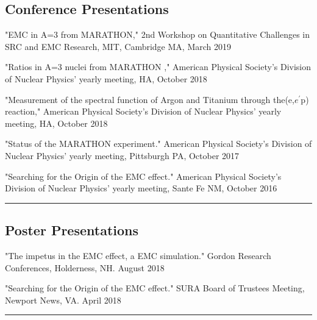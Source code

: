 \documentclass[12pt,letterpaper]{article}
\begin{document}
\subsection*{Conference Presentations}
\begin{itemize*}
	\item "EMC in A=3 from MARATHON," 2nd Workshop on Quantitative Challenges in SRC and EMC Research,  MIT, Cambridge MA,  March 2019
	\item "Ratios in A=3 nuclei from MARATHON ," American Physical Society's Division of Nuclear Physics' yearly meeting, HA, October 2018
	\item "Measurement of the spectral function of Argon and Titanium through the(e,$e^\prime$p) reaction," American Physical Society's Division of Nuclear Physics' yearly meeting, HA, October 2018
	\item "Status of the MARATHON experiment." American Physical Society's Division of Nuclear Physics' yearly meeting, Pittsburgh PA, October 2017
	\item "Searching for the Origin of the EMC effect." American Physical Society's Division of Nuclear Physics' yearly meeting, Sante Fe NM, October 2016
\end{itemize*}

\hrule
\subsection*{Poster Presentations}
\begin{itemize*}
	\item "The impetus in the EMC effect, a EMC simulation." Gordon Research Conferences, Holderness, NH. August 2018 
	\item "Searching for the Origin of the EMC effect." SURA Board of Trustees Meeting, Newport News, VA. April 2018 
\end{itemize*}
\hrule
\end{document}
